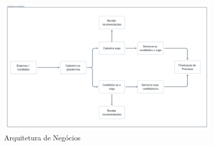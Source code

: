 \begin{figure}[H]
	\centering
	\caption{\label{fig-arq-negocio}Arquitetura de Negócios}
	\includegraphics[width=0.95\textwidth]{imagens/arq-proj-arq-negocio.png}
\end{figure}